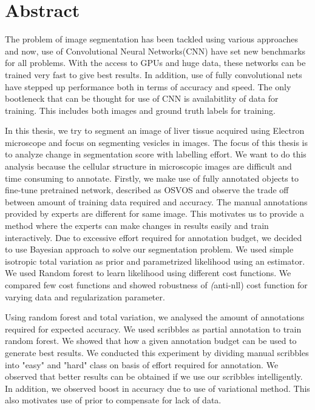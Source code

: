%

\newpage
\vspace{3cm}

\chapter*{Abstract}
The problem of image segmentation has been tackled using various approaches and now, use of Convolutional Neural Networks(CNN) have set new benchmarks for all problems. With the access to GPUs and huge data, these networks can be trained very fast to give best results. In addition, use of fully convolutional nets have stepped up performance both in terms of accuracy and speed. The only bootleneck that can be thought for use of CNN is availabitlity of data for training. This includes both images and ground truth labels for training. \par 
In this thesis, we try to segment an image of liver tissue acquired using Electron microscope and  focus on segmenting vesicles in images. The focus of this thesis is to analyze change in segmentation score with labelling effort. We want to do this analysis because the cellular structure in microscopic images are difficult and time consuming to annotate. Firstly, we make use of fully annotated objects to fine-tune pretrained network, described as OSVOS and observe the trade off between amount of training data required and accuracy.
The manual annotations provided by experts are different for same image. This motivates us to provide a method where the experts can make changes in results easily and train interactively. Due to excessive effort required for annotation budget, we decided to use Bayesian approach to solve our segmentation problem. We used simple isotropic total variation as prior and parametrized likelihood using an estimator. We used Random forest to learn likelihood using different cost functions. We compared few cost functions and showed robustness of \textit(anti-nll) cost function for varying data and regularization parameter. \par
Using random forest and total variation, we analysed the amount of annotations required for expected accuracy. We used scribbles as partial annotation to train random forest. We showed that how a given annotation budget can be used to generate best results. We conducted this experiment by dividing manual scribbles into "easy" and "hard" class on basis of effort required for annotation. We observed that better results can be obtained if we use our scribbles intelligently. In addition, we observed boost in accuracy due to use of variational method. This also motivates use of prior to compensate for lack of data.\par

